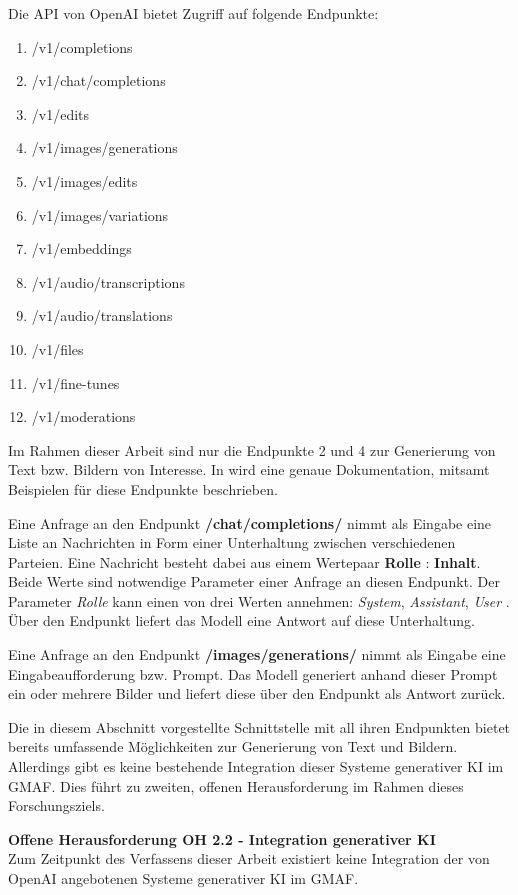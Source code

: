 Die API von OpenAI bietet Zugriff auf folgende Endpunkte:
\begin{enumerate}
    \item /v1/completions
    \item /v1/chat/completions
    \item /v1/edits
    \item /v1/images/generations
    \item /v1/images/edits
    \item /v1/images/variations
    \item /v1/embeddings
    \item /v1/audio/transcriptions
    \item /v1/audio/translations
    \item /v1/files
    \item /v1/fine-tunes
    \item /v1/moderations
\end{enumerate}
Im Rahmen dieser Arbeit sind nur die Endpunkte 2 und 4 zur Generierung von Text bzw. Bildern von Interesse.
In \cite{openai-api-doc} wird eine genaue Dokumentation, mitsamt Beispielen für diese Endpunkte beschrieben.

Eine Anfrage an den Endpunkt \textbf{/chat/completions/} nimmt als Eingabe eine Liste an Nachrichten in Form einer Unterhaltung zwischen verschiedenen Parteien.
Eine Nachricht besteht dabei aus einem Wertepaar \textbf{Rolle} : \textbf{Inhalt}.
Beide Werte sind notwendige Parameter einer Anfrage an diesen Endpunkt.
Der Parameter \textit{Rolle} kann einen von drei Werten annehmen: \textit{System}, \textit{Assistant}, \textit{User} \cite{openai-chat-compl-roles}.
Über den Endpunkt liefert das Modell eine Antwort auf diese Unterhaltung.

Eine Anfrage an den Endpunkt \textbf{/images/generations/} nimmt als Eingabe eine Eingabeaufforderung bzw. Prompt.
Das Modell generiert anhand dieser Prompt ein oder mehrere Bilder und liefert diese über den Endpunkt als Antwort zurück.

Die in diesem Abschnitt vorgestellte Schnittstelle mit all ihren Endpunkten bietet bereits umfassende Möglichkeiten zur Generierung von Text und Bildern.
Allerdings gibt es keine bestehende Integration dieser Systeme generativer KI im GMAF.
Dies führt zu zweiten, offenen Herausforderung im Rahmen dieses Forschungsziels.
\begin{tcolorbox}[minipage, colback=white, colframe=black, arc=0pt, outer arc=0pt]
    \textbf{Offene Herausforderung OH 2.2 - Integration generativer KI} \\
    Zum Zeitpunkt des Verfassens dieser Arbeit existiert keine Integration der von OpenAI angebotenen Systeme generativer KI im GMAF.
\end{tcolorbox}

